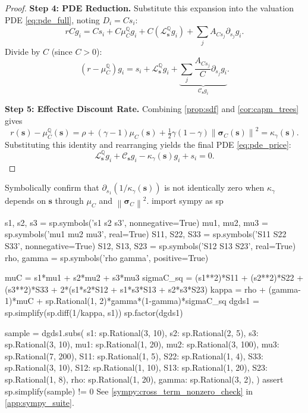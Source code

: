 \documentclass[11pt,letterpaper,oneside]{article}
\numberwithin{equation}{section}
\newenvironment{pyconsole}{\verbatim}{\endverbatim}
\newenvironment{pyconsole}{\verbatim}{\endverbatim}
\newcommand{\1}{\mathbf{1}}
\newcommand{\norm}[1]{\left\lVert #1\right\rVert}
\begin{document}
\begin{proof}
\textbf{Step 4: PDE Reduction.}
Substitute this expansion into the valuation PDE \eqref{eq:pde_full}, noting $D_i = C s_i$:
\[
    r C g_i = C s_i + C\mu_C^{\mathbb{Q}} g_i + C (\mathcal{L}^{\mathbb{Q}}_{\bm{s}} g_i) + \sum_j A_{C s_j} \partial_{s_j} g_i.
\]
Divide by $C$ (since $C>0$):
\[
    (r - \mu_C^{\mathbb{Q}}) g_i = s_i + \mathcal{L}^{\mathbb{Q}}_{\bm{s}} g_i + \underbrace{\sum_j \frac{A_{C s_j}}{C} \partial_{s_j} g_i}_{\mathcal{C}_{\bm{s}} g_i}.
\]

\textbf{Step 5: Effective Discount Rate.}
Combining \cref{prop:sdf} and \cref{cor:capm_trees} gives
\[
  r(\bm{s}) - \mu_C^{\mathbb{Q}}(\bm{s}) = \rho + (\gamma-1)\mu_C(\bm{s}) + \tfrac12 \gamma(1-\gamma)\norm{\bm{\sigma}_C(\bm{s})}^2 = \kappa_\gamma(\bm{s}).
\]
Substituting this identity and rearranging yields the final PDE \eqref{eq:pde_price}:
\[
    \mathcal{L}^{\mathbb{Q}}_{\bm{s}} g_i + \mathcal{C}_{\bm{s}} g_i - \kappa_\gamma(\bm{s}) g_i + s_i = 0.
\]
\end{proof}

\begin{sympycheck}[title={Verification: Cross-term is generically non-zero (\cref{thm:valuation_pde_reduced})}]\label{sympy:cross_term_nonzero}
Symbolically confirm that $\partial_{s_1}\!\left(1/\kappa_\gamma(\bm{s})\right)$ is not identically zero when $\kappa_\gamma$ depends on $\bm{s}$ through $\mu_C$ and $\norm{\bm{\sigma}_C}^2$.
\begin{pyconsole}
import sympy as sp

s1, s2, s3 = sp.symbols('s1 s2 s3', nonnegative=True)
mu1, mu2, mu3 = sp.symbols('mu1 mu2 mu3', real=True)
S11, S22, S33 = sp.symbols('S11 S22 S33', nonnegative=True)
S12, S13, S23 = sp.symbols('S12 S13 S23', real=True)
rho, gamma = sp.symbols('rho gamma', positive=True)

muC = s1*mu1 + s2*mu2 + s3*mu3
sigmaC_sq = (s1**2)*S11 + (s2**2)*S22 + (s3**2)*S33 + 2*(s1*s2*S12 + s1*s3*S13 + s2*s3*S23)
kappa = rho + (gamma-1)*muC + sp.Rational(1, 2)*gamma*(1-gamma)*sigmaC_sq
dgds1 = sp.simplify(sp.diff(1/kappa, s1))
sp.factor(dgds1)

sample = dgds1.subs({
    s1: sp.Rational(3, 10),
    s2: sp.Rational(2, 5),
    s3: sp.Rational(3, 10),
    mu1: sp.Rational(1, 20),
    mu2: sp.Rational(3, 100),
    mu3: sp.Rational(7, 200),
    S11: sp.Rational(1, 5),
    S22: sp.Rational(1, 4),
    S33: sp.Rational(3, 10),
    S12: sp.Rational(1, 10),
    S13: sp.Rational(1, 20),
    S23: sp.Rational(1, 8),
    rho: sp.Rational(1, 20),
    gamma: sp.Rational(3, 2),
})
assert sp.simplify(sample) != 0
\end{pyconsole}
See \cref{sympy:cross_term_nonzero_check} in \cref{app:sympy_suite}.\end{sympycheck}
\end{document}

